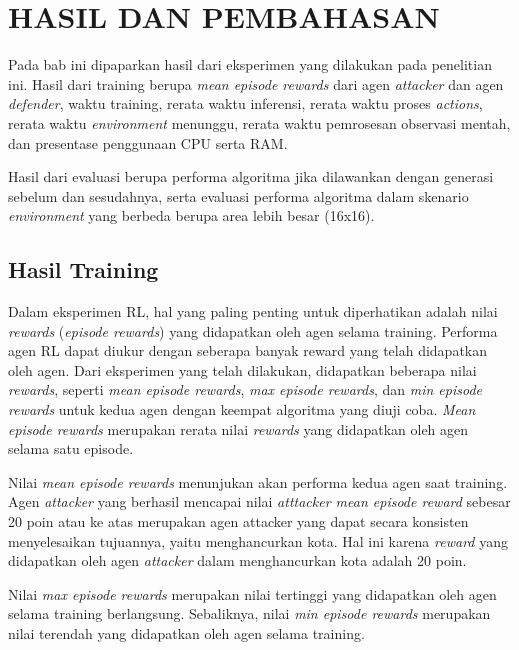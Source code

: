 \chapter{HASIL DAN PEMBAHASAN}
\label{chap:hasilpembahasan}

Pada bab ini dipaparkan hasil dari eksperimen yang dilakukan pada penelitian ini.
Hasil dari training berupa \emph{mean episode rewards} dari agen \emph{attacker} dan agen \emph{defender},
waktu training, rerata waktu inferensi, rerata waktu proses \emph{actions}, rerata waktu \emph{environment} menunggu,
rerata waktu pemrosesan observasi mentah, dan presentase penggunaan CPU serta RAM.

Hasil dari evaluasi berupa performa algoritma jika dilawankan dengan generasi sebelum dan sesudahnya,
serta evaluasi performa algoritma dalam skenario \emph{environment} yang berbeda berupa area lebih besar
(16x16).

\section{Hasil Training}

Dalam eksperimen RL, hal yang paling penting untuk diperhatikan adalah nilai \emph{rewards} (\emph{episode rewards}) yang didapatkan oleh agen
selama training. Performa agen RL dapat diukur dengan seberapa banyak reward yang telah didapatkan oleh agen.
Dari eksperimen yang telah dilakukan, didapatkan beberapa nilai \emph{rewards}, 
seperti \emph{mean episode rewards}, \emph{max episode rewards}, dan \emph{min episode rewards} untuk kedua agen dengan keempat algoritma yang diuji coba.
\emph{Mean episode rewards} merupakan rerata nilai \emph{rewards} yang didapatkan oleh agen selama satu episode.

Nilai \emph{mean episode rewards} menunjukan akan performa kedua agen saat training.
Agen \emph{attacker} yang berhasil mencapai nilai \emph{atttacker mean episode reward} sebesar 20 poin atau ke atas
merupakan agen attacker yang dapat secara konsisten menyelesaikan tujuannya, yaitu menghancurkan kota.
Hal ini karena \emph{reward} yang didapatkan oleh agen \emph{attacker} dalam menghancurkan kota adalah 20 poin.

Nilai \emph{max episode rewards} merupakan nilai tertinggi yang didapatkan oleh agen selama training berlangsung.
Sebaliknya, nilai \emph{min episode rewards} merupakan nilai terendah yang didapatkan oleh agen selama training.


